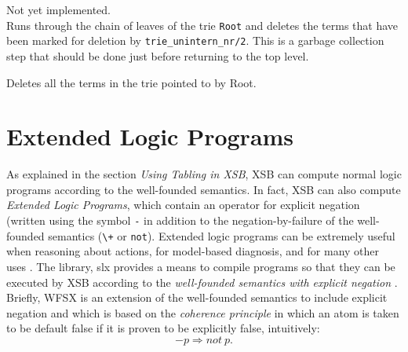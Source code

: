 \begin{description}
Not yet implemented.\\
Runs through the chain of leaves of the trie {\tt Root} and
deletes the terms that have been marked for deletion by
{\tt trie\_unintern\_nr/2}. This is a garbage collection step that should
be done just before returning to the top level.

 
Deletes all the terms in the trie pointed to by Root.


\end{description}



\section{Extended Logic Programs}  \label{library_utilities:wfsx}
As explained in the section {\it Using Tabling in XSB}, XSB can
compute normal logic programs according to the well-founded semantics.
In fact, XSB 
can also compute {\em Extended Logic Programs}, which contain an
operator for explicit negation (written using the symbol {\tt -} in
addition to the negation-by-failure of the well-founded semantics
(\verb|\+| or {\tt not}).  Extended logic programs can be extremely
useful when reasoning about actions, for model-based diagnosis, and
for many other uses \cite{AlPe95}.  The library, {\sf slx} provides a means
to compile programs so that they can be executed by XSB according to
the {\em well-founded semantics with explicit negation} \cite{ADP95}.
Briefly, WFSX is an extension of the well-founded semantics to include
explicit negation and which is based on the {\em coherence principle}
in which an atom is taken to be default false if it is proven to be
explicitly false, intuitively:
\[
-p \Rightarrow not\ p.
\]

